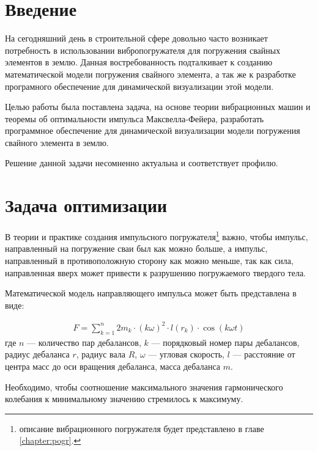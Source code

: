 \section*{Введение}

На сегодняшний день в строительной сфере довольно часто возникает потребность в использовании вибропогружателя для погружения свайных элементов в землю.
Данная востребованность подталкивает к созданию математической модели погружения свайного элемента,
а так же к разработке програмного обеспечение для динамической визуализации этой модели.

Целью работы была поставлена задача, на основе теории вибрационных машин и теоремы об оптимальности импульса Максвелла-Фейера,
разработать программное обеспечение для динамической визуализации модели погружения свайного элемента в землю.

Решение данной задачи несомненно актуальна и соответствует профилю.

\clearpage
\section{Задача оптимизации}

В теории и практике создания импульсного погружателя\footnote{описание вибрационного погружателя будет представлено в главе \ref{chapter:pogr}.}
важно, чтобы импульс, направленный на погружение сваи был как можно больше,
а импульс, направленный в противоположную сторону как можно меньше, так как сила, направленная вверх может привести к разрушению погружаемого
твердого тела.

Математической модель направляющего импульса может быть представлена в виде:

\begin{equation}\label{eq:harmonic_sum}
    \begin{gathered}
        F = \sum\limits_{k = 1}^n 2 m_k \cdot (k \omega)^2 \cdot l(r_k) \cdot \cos (k \omega t)
    \end{gathered}
\end{equation}
\noindent где $n$ --- количество пар дебалансов,
$k$ --- порядковый номер пары дебалансов, радиус дебаланса $r$, радиус вала $R$,
$\omega$ --- угловая скорость, $l$ --- расстояние от центра масс до оси вращения дебаланса,
масса дебаланса $m$.

Необходимо, чтобы соотношение максимального значения гармонического колебания к минимальному значению стремилось к максимуму.

